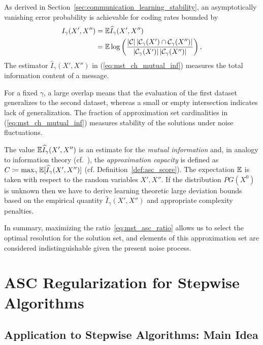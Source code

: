As derived in Section~\ref{sec:communication_learning_stability}, an
asymptotically vanishing error probability is achievable for coding rates
bounded by
\begin{align}
  I_\gamma(X', X'') &= \mathbb{E} \widehat I_\gamma(X', X'') \notag \\ 
  &=
  \mathbb{E} \log\left( \frac{|{\cal C}| \, |{{\cal C}}_{\gamma}(X') \cap
      {{\cal C}}_{\gamma}(X'')|}{|{{\cal C}}_{\gamma}(X')|
      \, |{{\cal C}}_{\gamma}(X'')|}\right), \label{eq:mst_ch_mutual_inf}
\end{align}
The estimator $\hat I_\gamma(X', X'')$ in (\ref{eq:mst_ch_mutual_inf}) measures
the total information content of a message.

For a fixed $\gamma$, a large overlap means that the evaluation of the first
dataset generalizes to the second dataset, whereas a small or empty intersection
indicates lack of generalization. The fraction of approximation set
cardinalities in (\ref{eq:mst_ch_mutual_inf}) measures stability of the solutions under
noise fluctuations.

The value $\mathbb{E} \widehat I_{\gamma}(X', X'')$ is an estimate for the \emph{mutual
information} and, in analogy to information theory
(cf.~\citep[Ch.~7]{Cover:2006}), the \emph{approximation capacity} is defined as
$C \coloneqq\max_{\gamma}\mathbb{E} [\widehat I_{\gamma}(X', X'')]$ (cf.
Definition~\ref{def:asc_score}). The expectation $\mathbb{E}$ is taken with respect
to the random variables $X', X''$. If the distribution $PG(X^0)$ is unknown then
we have to derive learning theoretic large deviation bounds based on the
empirical quantity $\hat I_{\gamma}(X', X'')$ and appropriate complexity
penalties.

In summary, maximizing the ratio~\eqref{eq:mst_asc_ratio} allows us to select the
optimal resolution for the solution set, and elements of this approximation set
are considered indistinguishable given the present noise process.

\section{ASC Regularization for Stepwise Algorithms}
\label{sec:mst_algorithmic_gen}

\subsection{Application to Stepwise Algorithms: Main Idea}

